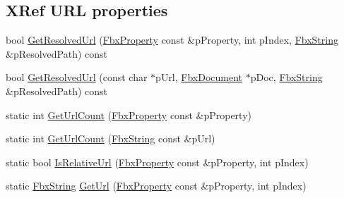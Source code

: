 \subsection*{X\+Ref U\+RL properties}
\begin{DoxyCompactItemize}
\item 
bool \hyperlink{class_fbx_x_ref_manager_ae4653dc13a58d58f84e4b4760568e756}{Get\+Resolved\+Url} (\hyperlink{class_fbx_property}{Fbx\+Property} const \&p\+Property, int p\+Index, \hyperlink{class_fbx_string}{Fbx\+String} \&p\+Resolved\+Path) const
\item 
bool \hyperlink{class_fbx_x_ref_manager_aaa0d59a531dffa6c36266328b60ca012}{Get\+Resolved\+Url} (const char $\ast$p\+Url, \hyperlink{class_fbx_document}{Fbx\+Document} $\ast$p\+Doc, \hyperlink{class_fbx_string}{Fbx\+String} \&p\+Resolved\+Path) const
\item 
static int \hyperlink{class_fbx_x_ref_manager_a9ea29928247d5542e8eaafbea0647201}{Get\+Url\+Count} (\hyperlink{class_fbx_property}{Fbx\+Property} const \&p\+Property)
\item 
static int \hyperlink{class_fbx_x_ref_manager_a619fbdf87fe5db100ad4eada1373b9d0}{Get\+Url\+Count} (\hyperlink{class_fbx_string}{Fbx\+String} const \&p\+Url)
\item 
static bool \hyperlink{class_fbx_x_ref_manager_a27481156423d70e759c131954e3ea9a0}{Is\+Relative\+Url} (\hyperlink{class_fbx_property}{Fbx\+Property} const \&p\+Property, int p\+Index)
\item 
static \hyperlink{class_fbx_string}{Fbx\+String} \hyperlink{class_fbx_x_ref_manager_af8e33d25b078d1852ef2b252175732d1}{Get\+Url} (\hyperlink{class_fbx_property}{Fbx\+Property} const \&p\+Property, int p\+Index)
\end{DoxyCompactItemize}
